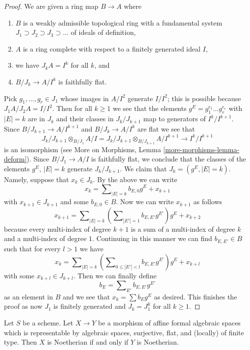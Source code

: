 \begin{proof}
\medskip\noindent
We are given a ring map $B \to A$ where
\begin{enumerate}
\item $B$ is a weakly admissible topological ring with a fundamental system
$J_1 \supset J_2 \supset J_3 \supset \ldots$ of ideals of definition,
\item $A$ is a ring complete with respect to a finitely generated
ideal $I$,
\item we have $J_k A = I^k$ for all $k$, and
\item $B/J_k \to A/I^k$ is faithfully flat.
\end{enumerate}
Pick $g_1, \ldots, g_r \in J_1$
whose images in $A/I^2$ generate $I/I^2$; this is possible because
$J_1A/J_2A = I/I^2$. Then for all $k \geq 1$ we see that the elements
$g^E = g_1^{e_1} \ldots g_r^{e_r}$ with $|E| = k$ are in $J_k$
and their classes in $J_k/J_{k + 1}$ map to generators of
$I^k/I^{k + 1}$. Since $B/J_{k + 1} \to A/I^{k + 1}$
and $B/J_k \to A/I^k$ are flat we see that
$$
J_k/J_{k + 1} \otimes_{B/J_1} A/I =
J_k/J_{k + 1} \otimes_{B/J_{k + 1}} A/I^{k + 1} \to I^k/I^{k + 1}
$$
is an isomorphism (see More on Morphisms, Lemma
\ref{more-morphisms-lemma-deform}). Since $B/J_1 \to A/I$ is
faithfully flat, we conclude that the classes of the elements
$g^E$, $|E| = k$ generate $J_k/J_{k + 1}$. We claim that
$J_k = (g^E, |E| = k)$. Namely, suppose that $x_k \in J_k$.
By the above we can write
$$
x_k = \sum\nolimits_{|E| = k} b_{E, 0} g^E + x_{k + 1}
$$
with $x_{k + 1} \in J_{k + 1}$ and some $b_{E, 0} \in B$. Now we can write
$x_{k + 1}$ as follows
$$
x_{k + 1} =
\sum\nolimits_{|E| = k}
\left(\sum\nolimits_{|E'| = 1} b_{E, E'}g^{E'}\right) g^E + x_{k + 2}
$$
because every multi-index of degree $k + 1$ is a sum of a multi-index
of degree $k$ and a multi-index of degree $1$. Continuing in this
manner we can find $b_{E, E'} \in B$ such that for every $l > 1$
we have
$$
x_k = \sum\nolimits_{|E| = k}
\left(\sum\nolimits_{0 \leq |E'| < l} b_{E, E'} g^{E'}\right) g^E + x_{k + l}
$$
with some $x_{k + l} \in J_{k + l}$. Then we can finally define
$$
b_E = \sum\nolimits_{E'} b_{E, E'} g^{E'}
$$
as an element in $B$ and we see that $x_k = \sum b_E g^E$ as desired.
This finishes the proof as now $J_1$ is finitely generated and $J_k = J_1^k$
for all $k \geq 1$.
\end{proof}

\begin{lemma}
\label{lemma-iff-noetherian}
Let $S$ be a scheme. Let $X \to Y$ be a morphism of affine
formal algebraic spaces which is representable by algebraic spaces,
surjective, flat, and (locally) of finite type. Then $X$ is Noetherian
if and only if $Y$ is Noetherian.
\end{lemma}

